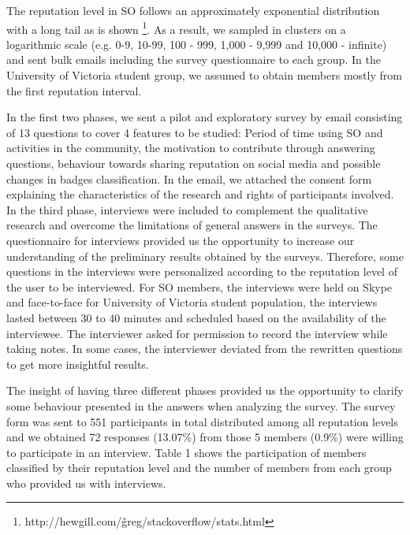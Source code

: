 \documentclass{sigchi}
\begin{document}
The reputation level in SO follows an approximately exponential distribution with a long tail as is shown \footnote{http://hewgill.com/\~greg/stackoverflow/stats.html}. As a result, we sampled in clusters on a logarithmic scale (e.g. 0-9, 10-99, 100 - 999, 1,000 - 9,999 and 10,000 - infinite) and sent bulk emails including the survey questionnaire to each group. In the University of Victoria student group, we assumed to obtain members mostly from the first reputation interval.

In the first two phases, we sent a pilot and exploratory survey by email consisting of 13 questions to cover 4 features to be studied: Period of time using SO and activities in the community, the motivation to contribute through answering questions, behaviour towards sharing reputation on social media and possible changes in badges classification. In the email, we attached the consent form explaining the characteristics of the research and rights of participants involved. In the third phase, interviews were included to complement the qualitative research and overcome the limitations of general answers in the surveys. The questionnaire for interviews provided us the opportunity to increase our understanding of the preliminary results obtained by the surveys. Therefore, some questions in the interviews were personalized according to the reputation level of the user to be interviewed. For SO members, the interviews were held on Skype and face-to-face for University of Victoria student population, the interviews lasted between 30 to 40 minutes and  scheduled based on the availability of the interviewee. The interviewer asked for permission to record the interview while taking notes. In some cases, the interviewer deviated from the rewritten questions to get more insightful results.

The insight of having three different phases provided us the opportunity to clarify some behaviour presented in the answers when analyzing the survey. The survey form was sent to 551 participants in total distributed among all reputation levels and we obtained 72 responses (13.07\%) from those 5 members (0.9\%) were willing to participate in an interview. Table 1 shows the participation of members classified by their reputation level and the number of members from each group who provided us with interviews.
\end{document}
